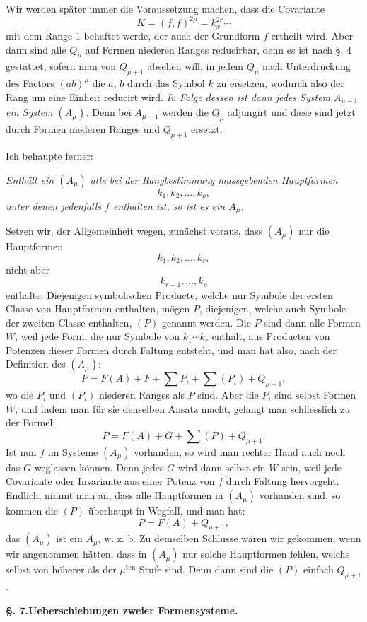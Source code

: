 \documentclass[10pt]{article}
\begin{document}
Wir werden später immer die Voraussetzung machen, dass die Covariante
\[
K=(f,f)^{2\mu}=k_x^{2r}\cdots
\]
mit dem Range 1 behaftet werde, der auch der Grundform $f$ ertheilt wird. Aber dann sind alle $Q_\mu$ auf Formen niederen Ranges reducirbar, denn es ist nach §. 4 gestattet, sofern man von $Q_{\mu+1}$ absehen will, in jedem $Q_\mu$ nach Unterdrückung des Factors $(ab)^\mu$ die $a$, $b$ durch das Symbol $k$ zu ersetzen, wodurch also der Rang um eine Einheit reducirt wird. \emph{In Folge dessen ist dann jedes System $A_{\mu-1}$ ein System $(A_\mu)$:} Denn bei $A_{\mu-1}$ werden die $Q_\mu$ adjungirt und diese sind jetzt durch Formen niederen Ranges und $Q_{\mu+1}$ ersetzt.

Ich behaupte ferner:

\emph{Enthält ein $(A_\mu)$ alle bei der Rangbestimmung massgebenden Hauptformen}
\[
k_1,k_2,\ldots,k_\varrho,
\]
\emph{unter denen jedenfalls $f$ enthalten ist, so ist es ein $A_\mu$.}

Setzen wir, der Allgemeinheit wegen, zunächst voraus, dass $(A_\mu)$ nur die Hauptformen
\[
k_1,k_2,\ldots,k_r,
\]
nicht aber
\[
k_{r+1},\ldots,k_\varrho
\]
enthalte. Diejenigen symbolischen Producte, welche nur Symbole der ersten Classe von Hauptformen enthalten, mögen $P$, diejenigen, welche auch Symbole der zweiten Classe enthalten, $(P)$ genannt werden. Die $P$ sind dann alle Formen $W$, weil jede Form, die nur Symbole von $k_1\cdots k_r$ enthält, aus Producten von Potenzen dieser Formen durch Faltung entsteht, und man hat also, nach der Definition des $(A_\mu)$:
\[
P=F(A)+F+\sum P_i+\sum(P_i)+Q_{\mu+1},
\]
wo die $P_i$ und $(P_i)$ niederen Ranges als $P$ sind. Aber die $P_i$ sind selbst Formen $W$, und indem man für sie denselben Ansatz macht, gelangt man schliesslich zu der Formel:
\[
P=F(A)+G+\sum(P)+Q_{\mu+1}.
\]
Ist nun $f$ im Systeme $(A_\mu)$ vorhanden, so wird man rechter Hand auch noch das $G$ weglassen können. Denn jedes $G$ wird dann selbst ein $W$ sein, weil jede Covariante oder Invariante aus einer Potenz von $f$ durch Faltung hervorgeht. Endlich, nimmt man an, dass alle Hauptformen in $(A_\mu)$ vorhanden sind, so kommen die $(P)$ überhaupt in Wegfall, und man hat:
\[
P=F(A)+Q_{\mu+1},
\]
das $(A_\mu)$ ist ein $A_\mu$, w. z. b. Zu demselben Schlusse wären wir gekommen, wenn wir angenommen hätten, dass in $(A_\mu)$ nur solche Hauptformen fehlen, welche selbst von höherer als der $\mu^{\mathrm{ten}}$ Stufe sind. Denn dann sind die $(P)$ einfach $Q_{\mu+1}$.

\begin{center}
{\bfseries §. 7.\quad Ueberschiebungen zweier Formensysteme.}
\end{center}
\end{document}

